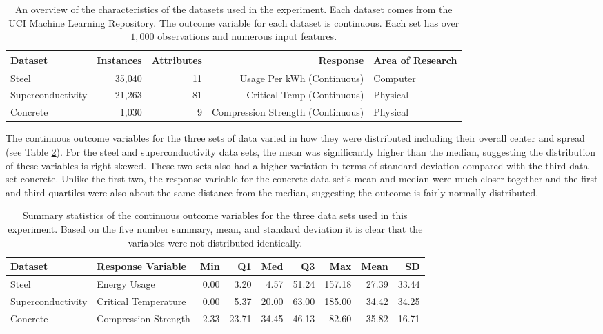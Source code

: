 \documentclass[10pt]{article}\usepackage[]{graphicx}\usepackage[]{xcolor}
\begin{document}
\begin{table}[h!]
  \begin{center}
    \begin{tabular}{l|r|r|r|l} %
      \textbf{Dataset} & \textbf{Instances} & \textbf{Attributes} & \textbf{Response} & \textbf{Area of Research}\\
      \hline
      Steel & 35,040 & 11 & Usage Per kWh (Continuous) & Computer \\
      Superconductivity & 21,263 & 81 & Critical Temp (Continuous) & Physical\\
      Concrete & 1,030 & 9 & Compression Strength (Continuous) & Physical \\
    \end{tabular}
  \caption{An overview of the characteristics of the datasets used in the experiment. Each dataset comes from the UCI Machine Learning Repository. The outcome variable for each dataset is continuous. Each set has over $1,000$ observations and numerous input features.}
  \label{tab:datasets}
  \end{center}
\end{table}


The continuous outcome variables for the three sets of data varied in how they were distributed including their overall center and spread (see Table \ref{tab:outcome_summary}). For the steel and superconductivity data sets, the mean was significantly higher than the median, suggesting the distribution of these variables is right-skewed. These two sets also had a higher variation in terms of standard deviation compared with the third data set concrete. Unlike the first two, the response variable for the concrete data set's mean and median were much closer together and the first and third quartiles were also about the same distance from the median, suggesting the outcome is fairly normally distributed. \\

\begin{table}[h!]
  \begin{center}
    \begin{tabular}{l|l|r|r|r|r|r|r|r}
\textbf{Dataset} & \textbf{Response Variable} & \textbf{Min} & \textbf{Q1} & \textbf{Med} & \textbf{Q3} & \textbf{Max} & \textbf{Mean} & \textbf{SD}\\
      \hline
      Steel & Energy Usage & 0.00 & 3.20 & 4.57 & 51.24 & 157.18 & 27.39 & 33.44\\
      Superconductivity & Critical Temperature & 0.00 & 5.37 & 20.00 & 63.00 & 185.00 & 34.42 & 34.25\\
      Concrete & Compression Strength & 2.33 & 23.71 & 34.45 & 46.13 & 82.60 & 35.82 & 16.71\\
    \end{tabular}
    \caption{Summary statistics of the continuous outcome variables for the three data sets used in this experiment. Based on the five number summary, mean, and standard deviation it is clear that the variables were not distributed identically.}
    \label{tab:outcome_summary}
  \end{center}
\end{table}
\end{document}
